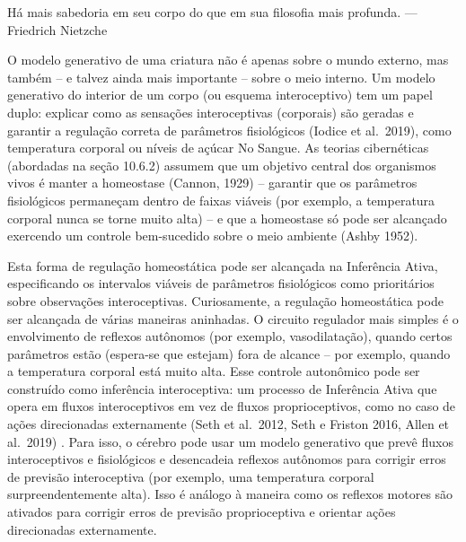 \documentclass[
  12pt,
]{book}
\begin{document}
Há mais sabedoria em seu corpo do que em sua filosofia mais profunda.
---Friedrich Nietzche

O modelo generativo de uma criatura não é apenas sobre o mundo externo, mas também -- e talvez ainda mais importante -- sobre o meio interno. Um modelo generativo do interior de um corpo (ou esquema interoceptivo) tem um papel duplo: explicar como as sensações interoceptivas (corporais) são geradas e garantir a regulação correta de parâmetros fisiológicos (Iodice et al.~2019), como temperatura corporal ou níveis de açúcar No Sangue. As teorias cibernéticas (abordadas na seção 10.6.2) assumem que um objetivo central dos organismos vivos é manter a homeostase (Cannon, 1929) -- garantir que os parâmetros fisiológicos permaneçam dentro de faixas viáveis (por exemplo, a temperatura corporal nunca se torne muito alta) -- e que a homeostase só pode ser alcançado exercendo um controle bem-sucedido sobre o meio ambiente (Ashby 1952).

Esta forma de regulação homeostática pode ser alcançada na Inferência Ativa, especificando os intervalos viáveis \hspace{0pt}\hspace{0pt}de parâmetros fisiológicos como prioritários sobre observações interoceptivas. Curiosamente, a regulação homeostática pode ser alcançada de várias maneiras aninhadas. O circuito regulador mais simples é o envolvimento de reflexos autônomos (por exemplo, vasodilatação), quando certos parâmetros estão (espera-se que estejam) fora de alcance -- por exemplo, quando a temperatura corporal está muito alta. Esse controle autonômico pode ser construído como inferência interoceptiva: um processo de Inferência Ativa que opera em fluxos interoceptivos em vez de fluxos proprioceptivos, como no caso de ações direcionadas externamente (Seth et al.~2012, Seth e Friston 2016, Allen et al.~2019) . Para isso, o cérebro pode usar um modelo generativo que prevê fluxos interoceptivos e fisiológicos e desencadeia reflexos autônomos para corrigir erros de previsão interoceptiva (por exemplo, uma temperatura corporal surpreendentemente alta). Isso é análogo à maneira como os reflexos motores são ativados para corrigir erros de previsão proprioceptiva e orientar ações direcionadas externamente.
\end{document}
